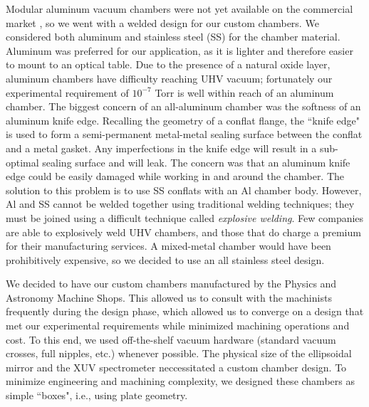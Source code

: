 Modular aluminum vacuum chambers were not yet available on the commercial market \cite{piperAndrewPiperDissertation2022}, so we went with a welded design for our custom chambers. We considered both aluminum and stainless steel (SS) for the chamber material. Aluminum was preferred for our application, as it is lighter and therefore easier to mount to an optical table. Due to the presence of a natural oxide layer, aluminum chambers have difficulty reaching UHV vacuum; fortunately our experimental requirement of $10^{-7}$ Torr is well within reach of an aluminum chamber. The biggest concern of an all-aluminum chamber was the softness of an aluminum knife edge. Recalling the geometry of a conflat flange, the ``knife edge" is used to form a semi-permanent metal-metal sealing surface between the conflat and a metal gasket. Any imperfections in the knife edge will result in a sub-optimal sealing surface and will leak. The concern was that an aluminum knife edge could be easily damaged while working in and around the chamber. The solution to this problem is to use SS conflats with an Al chamber body. However, Al and SS cannot be welded together using traditional welding techniques; they must be joined using a difficult technique called \textit{explosive welding}. Few companies are able to explosively weld UHV chambers, and those that do charge a premium for their manufacturing services. A mixed-metal chamber would have been prohibitively expensive, so we decided to use an all stainless steel design.

We decided to have our custom chambers manufactured by the Physics and Astronomy Machine Shops. This allowed us to consult with the machinists frequently during the design phase, which allowed us to converge on a design that met our experimental requirements while minimized machining operations and cost. To this end, we used off-the-shelf vacuum hardware (standard vacuum crosses, full nipples, etc.) whenever possible. The physical size of the ellipsoidal mirror and the XUV spectrometer neccessitated a custom chamber design. To minimize engineering and machining complexity, we designed these chambers as simple ``boxes", i.e., using plate geometry.



